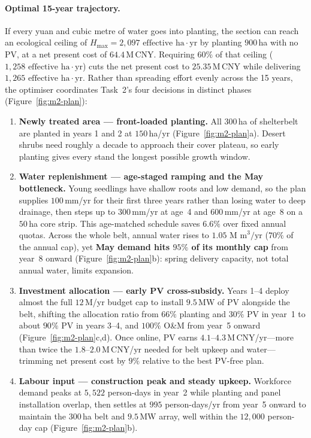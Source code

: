 \paragraph{Optimal 15-year trajectory.} If every yuan and cubic metre of water goes into planting, the section can reach an ecological ceiling of $H_{\max}=2{,}097\text{ effective ha}\cdot\text{yr}$ by planting $900$\,ha with no PV, at a net present cost of $64.4$\,M\,CNY. Requiring $60\%$ of that ceiling ($1{,}258\text{ effective ha}\cdot\text{yr}$) cuts the net present cost to $25.35$\,M\,CNY while delivering $1{,}265\text{ effective ha}\cdot\text{yr}$. Rather than spreading effort evenly across the 15 years, the optimiser coordinates Task~2's four decisions in distinct phases (Figure~\ref{fig:m2-plan}):
\begin{enumerate}\setlength{\itemsep}{2pt}\setlength{\parsep}{0pt}
  \item \textbf{Newly treated area --- front-loaded planting.} All $300$\,ha of shelterbelt are planted in years 1 and 2 at $150$\,ha/yr (Figure~\ref{fig:m2-plan}a). Desert shrubs need roughly a decade to approach their cover plateau, so early planting gives every stand the longest possible growth window.
  \item \textbf{Water replenishment --- age-staged ramping and the May bottleneck.} Young seedlings have shallow roots and low demand, so the plan supplies $100$\,mm/yr for their first three years rather than losing water to deep drainage, then steps up to $300$\,mm/yr at age~4 and $600$\,mm/yr at age~8 on a $50$\,ha core strip. This age-matched schedule saves $6.6\%$ over fixed annual quotas. Across the whole belt, annual water rises to $1.05\text{ M m}^3\text{/yr}$ ($70\%$ of the annual cap), yet \textbf{May demand hits $95\%$ of its monthly cap} from year~8 onward (Figure~\ref{fig:m2-plan}b): spring delivery capacity, not total annual water, limits expansion.
  \item \textbf{Investment allocation --- early PV cross-subsidy.} Years 1--4 deploy almost the full $12$\,M/yr budget cap to install $9.5$\,MW of PV alongside the belt, shifting the allocation ratio from $66\%$ planting and $30\%$ PV in year~1 to about $90\%$ PV in years 3--4, and $100\%$ O\&M from year~5 onward (Figure~\ref{fig:m2-plan}c,d). Once online, PV earns $4.1\text{--}4.3$\,M\,CNY/yr---more than twice the $1.8\text{--}2.0$\,M\,CNY/yr needed for belt upkeep and water---trimming net present cost by $9\%$ relative to the best PV-free plan.
  \item \textbf{Labour input --- construction peak and steady upkeep.} Workforce demand peaks at $5{,}522$ person-days in year~2 while planting and panel installation overlap, then settles at $995$ person-days/yr from year~5 onward to maintain the $300$\,ha belt and $9.5$\,MW array, well within the $12{,}000$ person-day cap (Figure~\ref{fig:m2-plan}b).
\end{enumerate}

